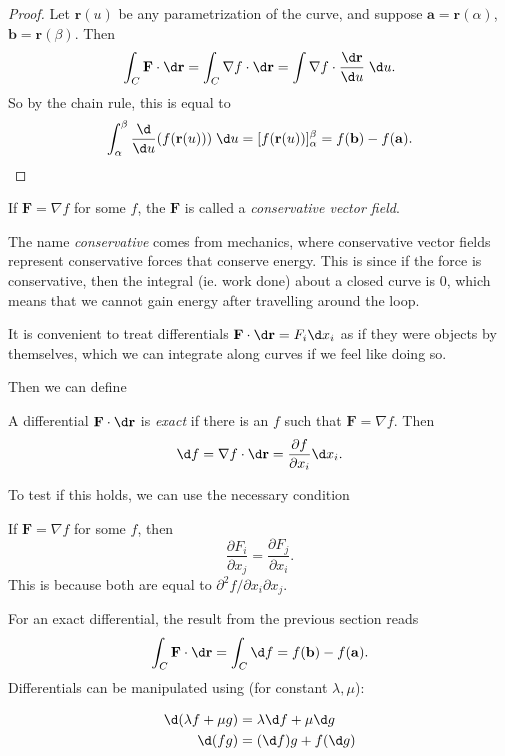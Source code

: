 \documentclass[a4paper]{article}
\begin{document}
\begin{proof}
  Let $\mathbf{r}(u)$ be any parametrization of the curve, and suppose $\mathbf{a} = \mathbf{r}(\alpha)$, $\mathbf{b} = \mathbf{r}(\beta)$. Then
  \[
    \int_C \mathbf{F}\cdot \d \mathbf{r} = \int_C\nabla f\cdot \d \mathbf{r} = \int \nabla f\cdot \frac{\d \mathbf{r}}{\d u}\; \d u.
  \]
  So by the chain rule, this is equal to
  \[
    \int_\alpha^\beta \frac{\d }{\d u} (f(\mathbf{r}(u))) \;\d u = [f(\mathbf{r}(u))]_\alpha^\beta = f(\mathbf{b}) - f(\mathbf{a}).
  \]
\end{proof}

\begin{defi}
  If $\mathbf{F} = \nabla f$ for some $f$, the $\mathbf{F}$ is called a \emph{conservative vector field}.
\end{defi}

The name \emph{conservative} comes from mechanics, where conservative vector fields represent conservative forces that conserve energy. This is since if the force is conservative, then the integral (ie. work done) about a closed curve is $0$, which means that we cannot gain energy after travelling around the loop.

It is convenient to treat differentials $\mathbf{F}\cdot \d \mathbf{r} = F_i \d x_i$ as if they were objects by themselves, which we can integrate along curves if we feel like doing so.

Then we can define
\begin{defi}
  A differential $\mathbf{F}\cdot\d \mathbf{r}$ is \emph{exact} if there is an $f$ such that $\mathbf{F} = \nabla f$. Then
  \[
    \d f = \nabla f\cdot \d \mathbf{r} = \frac{\partial f}{\partial x_i} \d x_i.
  \]
\end{defi}

To test if this holds, we can use the necessary condition
\begin{prop}
  If $\mathbf{F} = \nabla f$ for some $f$, then
  \[
    \frac{\partial F_i}{\partial x_j} = \frac{\partial F_j}{\partial x_i}.
  \]
  This is because both are equal to $\partial^2 f/\partial x_i\partial x_j$.
\end{prop}

For an exact differential, the result from the previous section reads
\[
  \int_C \mathbf{F}\cdot \d \mathbf{r} = \int_C \d f = f(\mathbf{b}) - f(\mathbf{a}).
\]
Differentials can be manipulated using (for constant $\lambda, \mu$):
\begin{prop}
  \begin{align*}
    \d (\lambda f + \mu g) &= \lambda \d f + \mu \d g\\
    \d (fg) &= (\d f)g + f(\d g)
  \end{align*}
\end{prop}
\end{document}
